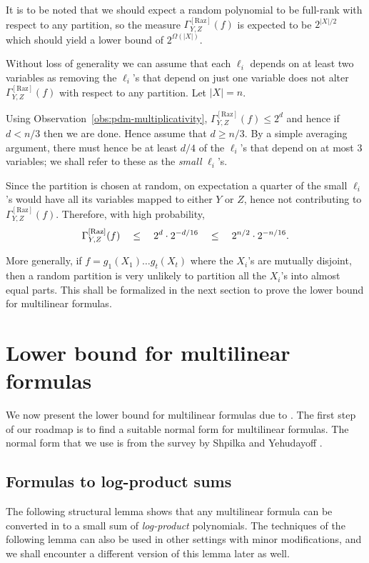 \documentclass[12pt]{report}
\newcommand{\CM}[1]{\Gamma^{\mathrm{[#1]}}}
\begin{document}
It is to be noted that we should expect a random polynomial to be full-rank with respect to any partition, so the measure $\CM{Raz}_{Y,Z}(f)$ is expected to be $2^{|X|/2}$ which should yield a lower bound of $2^{\Omega(|X|)}$. 

\begin{proof-sketch}
Without loss of generality we can assume that each $\ell_i$ depends on at least two variables as removing the $\ell_i$'s that depend on just one variable does not alter $\CM{Raz}_{Y,Z}(f)$ with respect to any partition. Let $|X| = n$. 

Using Observation~\ref{obs:pdm-multiplicativity}, $\CM{Raz}_{Y,Z}(f) \leq 2^d$ and hence if $d < n/3$ then we are done. Hence assume that $d \geq n/3$. By a simple averaging argument, there must hence be at least $d/4$ of the $\ell_i$'s that depend on at most $3$ variables; we shall refer to these as the \emph{small} $\ell_i$'s. 

Since the partition is chosen at random, on expectation a quarter of the small $\ell_i$'s would have all its variables mapped to either $Y$ or $Z$, hence not contributing to $\CM{Raz}_{Y,Z}(f)$. Therefore, with high probability,
$$
\CM{Raz}_{Y,Z}(f) \quad \leq \quad 2^{d} \cdot 2^{-d/16} \spaced{\leq} 2^{n/2} \cdot 2^{-n/16}.
$$
\end{proof-sketch}

More generally, if $f = g_1(X_1)\dots g_t(X_t)$ where the $X_i$'s are mutually disjoint, then a random partition is very unlikely to partition all the $X_i$'s into almost equal parts. This shall be formalized in the next section to prove the lower bound for multilinear formulas. 

\section{Lower bound for multilinear formulas}
	We now present the lower bound for multilinear formulas due 
	to \cite{raz2004}. The first step of our roadmap is to find 
	a suitable normal form for multilinear formulas. The normal 
	form that we use is from the survey by Shpilka and 
	Yehudayoff \cite{sy}. 	

\subsection{Formulas to log-product sums}

The following structural lemma shows that any multilinear formula can be converted in to a small sum of \emph{log-product} polynomials. The techniques of the following lemma can also be used in other settings with minor modifications, and we shall encounter a different version of this lemma later as well.
\end{document}
